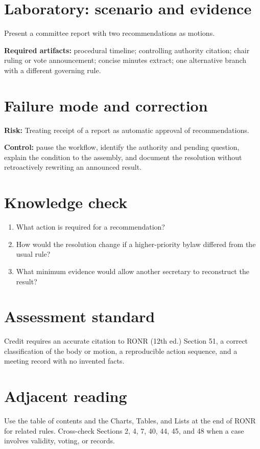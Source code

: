 \documentclass[11pt]{article}
\begin{document}
\section{Laboratory: scenario and evidence}
Present a committee report with two recommendations as motions.

\textbf{Required artifacts:} procedural timeline; controlling authority citation; chair ruling or vote announcement; concise minutes extract; one alternative branch with a different governing rule.

\section{Failure mode and correction}
\textbf{Risk:} Treating receipt of a report as automatic approval of recommendations.

\textbf{Control:} pause the workflow, identify the authority and pending question, explain the condition to the assembly, and document the resolution without retroactively rewriting an announced result.

\section{Knowledge check}
\begin{enumerate}[leftmargin=*,itemsep=4pt]
\item What action is required for a recommendation?
\item How would the resolution change if a higher-priority bylaw differed from the usual rule?
\item What minimum evidence would allow another secretary to reconstruct the result?
\end{enumerate}

\section{Assessment standard}
Credit requires an accurate citation to RONR (12th ed.) Section 51, a correct classification of the body or motion, a reproducible action sequence, and a meeting record with no invented facts.

\section{Adjacent reading}
Use the table of contents and the Charts, Tables, and Lists at the end of RONR for related rules. Cross-check Sections 2, 4, 7, 40, 44, 45, and 48 when a case involves validity, voting, or records.
\end{document}

